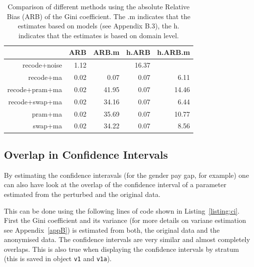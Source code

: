 \documentclass[12pt]{article}
\begin{document}
\begin{table}[ht]
\begin{center}
\caption{\label{tab:gini}Comparison of different methods using the absolute Relative Bias (ARB) of the Gini coefficient. 
The .m indicates that the estimates based on models (see Appendix B.3), the h. indicates that the estimates is based on domain level.\vspace{0.2cm}}
\begin{tabular}{rrrrr}
  \hline
 & ARB & ARB.m & h.ARB & h.ARB.m \\ 
  \hline
recode+noise & 1.12 &  & 16.37 &  \\ 
  recode+ma & 0.02 & 0.07 & 0.07 & 6.11 \\ 
  recode+pram+ma & 0.02 & 41.95 & 0.07 & 14.46 \\ 
  recode+swap+ma & 0.02 & 34.16 & 0.07 & 6.44 \\ 
  pram+ma & 0.02 & 35.69 & 0.07 & 10.77 \\ 
  swap+ma & 0.02 & 34.22 & 0.07 & 8.56 \\ 
   \hline
\end{tabular}
\end{center}
\end{table}

\subsection{Overlap in Confidence Intervals}
By estimating the confidence interavals (for the gender pay gap, for example) one can also 
have look at the overlap of the confidence interval
of a parameter estimated from the perturbed and the original data.

This can be done using the following lines of code shown in Listing~\ref{listing:ci}.
First the Gini coefficient and its variance (for more details on variane estimation see Appendix~\ref{appB}) 
is estimated from both, the original data and the anonymised data. The confidence intervals are 
very similar and almost completely overlaps. This is also true when displaying the confidence intervals by stratum
(this is saved in object \texttt{v1} and \texttt{v1a}).
\end{document}
